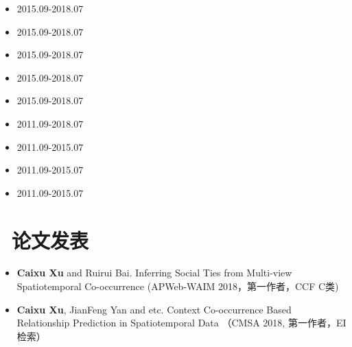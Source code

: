 \documentclass{resume}
\begin{document}
\begin{itemize} [parsep=0.5ex]

\item   {}                                      {2015.09-2018.07}
\item   {}                                         {2015.09-2018.07}
\item   {}                                         {2015.09-2018.07}
\item   {}                                         {2015.09-2018.07}
\item   {}                                    {2015.09-2018.07}

\item   {}                                  {2011.09-2018.07}

\item   {}                                  {2011.09-2015.07}
\item   {}                                    {2011.09-2015.07}
\item   {}                                     {2011.09-2015.07}

\end{itemize}


\medskip










\section{   \faBook    \ 论文发表}

\begin{itemize}[parsep=0.5ex]

  \item \textbf{Caixu Xu} and Ruirui Bai. Inferring Social Ties from Multi-view Spatiotemporal Co-occurrence (APWeb-WAIM 2018，第一作者，CCF C类)
  \item \textbf{Caixu Xu}, JianFeng Yan and etc.   Context Co-occurrence Based Relationship Prediction in Spatiotemporal Data （CMSA 2018, 第一作者，EI检索）
  
\end{itemize}
\end{document}
